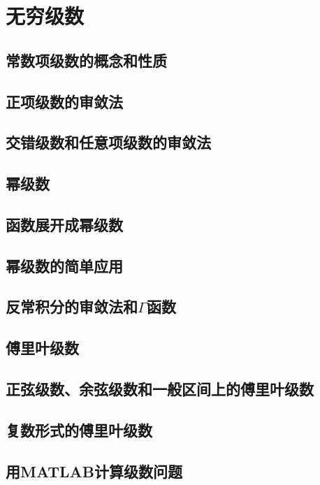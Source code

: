 \chapter{无穷级数}\label{cha:6}

\section{常数项级数的概念和性质}

\section{正项级数的审敛法}

\section{交错级数和任意项级数的审敛法}

\section{幂级数}

\section{函数展开成幂级数}

\section{幂级数的简单应用}

\section{反常积分的审敛法和$\Gamma$函数}

\section{傅里叶级数}

\section{正弦级数、余弦级数和一般区间上的傅里叶级数}

\section{复数形式的傅里叶级数}

\section{用MATLAB计算级数问题}



